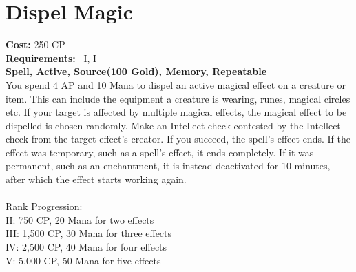 \section{Dispel Magic}
\textbf{Cost:} 250 CP\\
\textbf{Requirements:}~ I, I\\
\textbf{Spell, Active, Source(100 Gold), Memory, Repeatable}\\
You spend 4 AP and 10 Mana to dispel an active magical effect on a creature or item.
This can include the equipment a creature is wearing, runes, magical circles etc.
If your target is affected by multiple magical effects, the magical effect to be dispelled is chosen randomly.
Make an Intellect check contested by the Intellect check from the target effect's creator.
If you succeed, the spell's effect ends.
If the effect was temporary, such as a spell's effect, it ends completely.
If it was permanent, such as an enchantment, it is instead deactivated for 10 minutes, after which the effect starts working again.\\
\\
Rank Progression:\\
II: 750 CP, 20 Mana for two effects\\
III: 1,500 CP, 30 Mana for three effects\\
IV: 2,500 CP, 40 Mana for four effects\\
V: 5,000 CP, 50 Mana for five effects\\